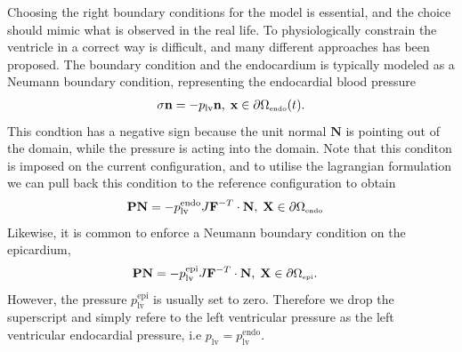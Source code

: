 Choosing the right boundary conditions for the model is essential,
and the choice should mimic what is observed in the real life. To
physiologically constrain the ventricle in a correct way is difficult,
and many different approaches has been proposed.
The boundary condition and the endocardium is typically modeled as a
Neumann boundary condition, representing the endocardial blood
pressure
\begin{align}
  \sigma \mathbf{n} = -p_{\mathrm{lv}} \mathbf{n}, \;  \mathbf{x} \in  \partial \Omega_{ \textnormal{\tiny \text{endo}}}(t).
\end{align}
This condtion has a negative sign because the unit normal
$\mathbf{N}$ is pointing out of the domain, while the pressure is
acting into the domain. 
Note that this conditon is imposed on the current configuration, and
to utilise the lagrangian formulation we can pull back this condition
to the reference configuration to obtain
\begin{align}
  \mathbf{P}\mathbf{N} &= -p_{\mathrm{lv}}^{\mathrm{endo}} J\mathbf{F}^{-T} \cdot \mathbf{N}, \;  \mathbf{X} \in \partial \Omega_{ \textnormal{\tiny \text{endo}}}
\end{align}
Likewise, it is common to enforce a
Neumann boundary condition on the epicardium,
\begin{align}
\mathbf{P}\mathbf{N}  &= -p_{\mathrm{lv}}^{\mathrm{epi}} J\mathbf{F}^{-T} \cdot \mathbf{N}, \;  \mathbf{X} \in \partial \Omega_{ \textnormal{\tiny \text{epi}}}.
\end{align}
However, the pressure $p_{\mathrm{lv}}^{\mathrm{epi}}$ is usually set
to zero. Therefore we drop the superscript and simply refere to the
left ventricular pressure as the left ventricular endocardial
pressure, i.e $p_{\mathrm{lv}} = p_{\mathrm{lv}}^{\mathrm{endo}}$.

